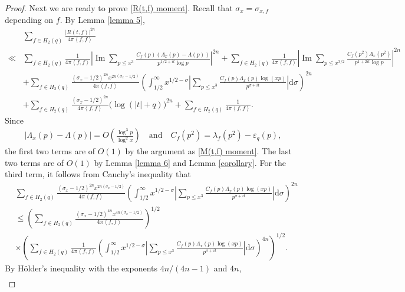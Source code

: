 \documentclass[11pt,reqno]{amsart}
\newcommand{\bna}{\begin{eqnarray*}}
\newcommand{\ena}{\end{eqnarray*}}
\numberwithin{equation}{section}
\theoremstyle{plain}
\theoremstyle{definition}
\renewcommand{\Im}{\operatorname{Im}}
\begin{document}
\begin{proof}
Next we are ready to prove \eqref{R(t,f) moment}.
Recall that $\sigma_x=\sigma_{x,f}$ depending on $f$.
By Lemma \ref{lemma 5},
\begin{equation}\label{R}
\begin{split}
&\sum_{f\in H_2(q)}\frac{|R(t,f)|^{2n}}{4\pi \left<f,f\right>}\\
\ll&\sum_{f\in H_2(q)}\frac{1}{4\pi \left<f,f\right>}\left|\Im\sum_{p\leq x^3}
\frac{C_f(p)(\Lambda_x(p)-\Lambda(p))}{p^{1/2+it}\log p}\right|^{2n}
+\sum_{f\in H_2(q)}\frac{1}{4\pi \left<f,f\right>}
\left|\Im\sum_{p\leq x^{3/2}}\frac{C_f(p^2)\Lambda_x(p^2)}{p^{1+2it}\log p}\right|^{2n}\\
&+\sum_{f\in H_2(q)}\frac{(\sigma_x-1/2)^{2n}x^{2n(\sigma_x-1/2)}}{4\pi \left<f,f\right>}\left(\int_{1/2}^\infty
x^{1/2-\sigma}\left|\sum_{p\leq x^3}
\frac{C_f(p)\Lambda_x(p)\log(xp)}{p^{\sigma+it}}\right|\mathrm{d}\sigma\right)^{2n}\\
&+\sum_{f\in H_2(q)}\frac{(\sigma_x-1/2)^{2n}}{4\pi \left<f,f\right>}\big(\log(|t|+q)\big)^{2n}
+\sum_{f\in H_2(q)}\frac{1}{4\pi \left<f,f\right>}.
\end{split}
\end{equation}
Since
\bna
|\Lambda_x(p)-\Lambda(p)|=O\left(\frac{\log^3p}{\log^2x}\right)\quad\text{and}\quad
C_f(p^2)=\lambda_f(p^2)-\varepsilon_q(p),
\ena
the first two terms are of $O(1)$ by the argument as \eqref{M(t,f) moment}.
The last two terms are of $O(1)$ by Lemma \ref{lemma 6} and Lemma \ref{corollary}.
For the third term,
it follows from Cauchy's inequality that
\begin{equation*}
\begin{split}
&\sum_{f\in H_2(q)}\frac{(\sigma_x-1/2)^{2n}x^{2n(\sigma_x-1/2)}}{4\pi \left<f,f\right>}\left(\int_{1/2}^\infty
x^{1/2-\sigma}\left|\sum_{p\leq x^3}
\frac{C_f(p)\Lambda_x(p)\log(xp)}{p^{\sigma+it}}\right|\mathrm{d}\sigma\right)^{2n}\\
&\leq \left(\sum_{f\in H_2(q)}\frac{(\sigma_x-1/2)^{4n}x^{4n(\sigma_x-1/2)}}{4\pi \left<f,f\right>}\right)^{1/2}\\
&\times\left(\sum_{f\in H_2(q)}\frac{1}{4\pi \left<f,f\right>}\left(\int_{1/2}^\infty
x^{1/2-\sigma}\left|\sum_{p\leq x^3}
\frac{C_f(p)\Lambda_x(p)\log(xp)}{p^{\sigma+it}}\right|\mathrm{d}\sigma\right)^{4n}\right)^{1/2}.
\end{split}
\end{equation*}
By H\"{o}lder's inequality with the exponents $4n/(4n-1)$ and $4n$,
\begin{equation*}
\begin{split}

\end{split}
\end{equation*}
\end{proof}
\end{document}
